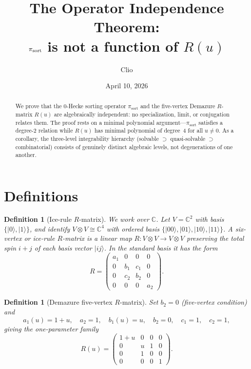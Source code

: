 \documentclass[11pt]{article}
\title{The Operator Independence Theorem:\\
  $\pisort$ is not a function of $R(u)$}
\author{Clio}
\date{April 10, 2026}
\newtheorem{definition}[theorem]{Definition}
\theoremstyle{remark}
\newcommand{\CC}{\mathbb{C}}
\newcommand{\ket}[1]{|#1\rangle}
\newcommand{\pisort}{\pi_{\mathrm{sort}}}
\begin{document}
\maketitle

\begin{abstract}
We prove that the 0-Hecke sorting operator $\pisort$ and the five-vertex
Demazure $R$-matrix $R(u)$ are algebraically independent: no specialization,
limit, or conjugation relates them. The proof rests on a minimal polynomial
argument---$\pisort$ satisfies a degree-2 relation while $R(u)$ has minimal
polynomial of degree~4 for all $u \neq 0$. As a corollary, the three-level
integrability hierarchy (solvable $\supset$ quasi-solvable $\supset$ combinatorial)
consists of genuinely distinct algebraic levels, not degenerations of one another.
\end{abstract}

\section{Definitions}

\begin{definition}[Ice-rule $R$-matrix]
We work over $\CC$. Let $V = \CC^2$ with basis $\{\ket{0}, \ket{1}\}$,
and identify $V \otimes V \cong \CC^4$ with ordered basis
$\{\ket{00}, \ket{01}, \ket{10}, \ket{11}\}$.
A \emph{six-vertex} or \emph{ice-rule} $R$-matrix is a linear map
$R\colon V \otimes V \to V \otimes V$ preserving the total spin $i+j$ of
each basis vector $\ket{ij}$. In the standard basis it has the form
\[
  R = \begin{pmatrix}
    a_1 & 0   & 0   & 0   \\
    0   & b_1 & c_1 & 0   \\
    0   & c_2 & b_2 & 0   \\
    0   & 0   & 0   & a_2
  \end{pmatrix}.
\]
\end{definition}

\begin{definition}[Demazure five-vertex $R$-matrix]\label{def:Ru}
Set $b_2 = 0$ (five-vertex condition) and
\[
  a_1(u) = 1+u,\quad a_2 = 1,\quad b_1(u) = u,\quad
  b_2 = 0,\quad c_1 = 1,\quad c_2 = 1,
\]
giving the one-parameter family
\begin{equation}\label{eq:Ru}
  R(u) = \begin{pmatrix}
    1+u & 0 & 0 & 0 \\
    0   & u & 1 & 0 \\
    0   & 1 & 0 & 0 \\
    0   & 0 & 0 & 1
  \end{pmatrix}.
\end{equation}
\end{definition}
\end{document}
